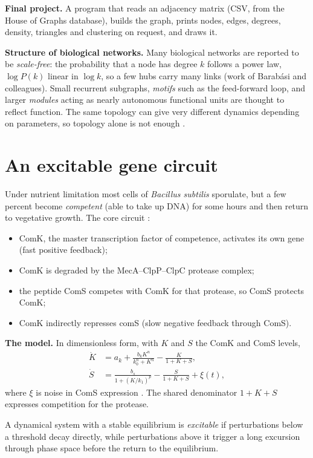 \textbf{Final project.}
A program that reads an adjacency matrix
(CSV, from the House of Graphs database),
builds the graph, prints nodes, edges,
degrees, density, triangles and clustering
on request, and draws it.

\textbf{Structure of biological
networks.}
Many biological networks are reported to be
\emph{scale-free}: the probability that a
node has degree $k$ follows a power law,
$\log P(k)$ linear in $\log k$, so a few
hubs carry many links (work of Barab\'asi
and colleagues). Small recurrent subgraphs,
\emph{motifs} such as the feed-forward
loop, and larger \emph{modules} acting as
nearly autonomous functional units are
thought to reflect function. The same
topology can give very different dynamics
depending on parameters, so topology alone
is not enough
\cite{stokes2007modeling}.

\section{An excitable gene circuit}
\label{section-comk-coms}

Under nutrient limitation most cells of
\emph{Bacillus subtilis} sporulate, but a
few percent become \emph{competent} (able
to take up DNA) for some hours and then
return to vegetative growth. The core
circuit
\cite{suel2006excitable}:
\begin{itemize}
\item ComK, the master transcription factor
of competence, activates its own gene
(fast positive feedback);
\item ComK is degraded by the
MecA--ClpP--ClpC protease complex;
\item the peptide ComS competes with ComK
for that protease, so ComS protects ComK;
\item ComK indirectly represses comS
(slow negative feedback through ComS).
\end{itemize}

\textbf{The model.}
In dimensionless form, with $K$ and $S$ the
ComK and ComS levels,
$$
\begin{aligned}
\dot K &= a_k + \frac{b_k K^n}{k_0^n+K^n}
- \frac{K}{1+K+S},\\
\dot S &= \frac{b_s}{1+(K/k_1)^p}
- \frac{S}{1+K+S} + \xi(t),
\end{aligned}
$$
where $\xi$ is noise in ComS expression
\cite[Box 1]{suel2006excitable}. The
shared denominator $1+K+S$ expresses
competition for the protease.

\begin{definition}
\label{definition-excitable}
A dynamical system with a stable
equilibrium is \emph{excitable} if
perturbations below a threshold decay
directly, while perturbations above it
trigger a long excursion through phase
space before the return to the
equilibrium.
\end{definition}


